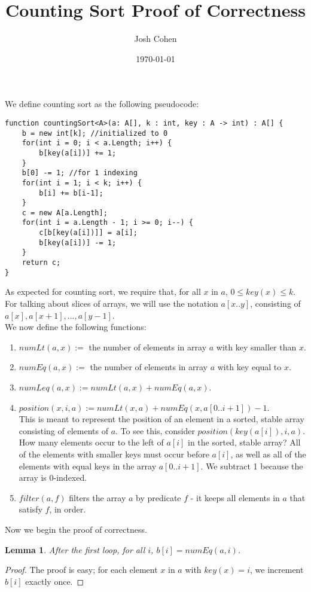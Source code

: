 \documentclass{article}
\title{Counting Sort Proof of Correctness}
\author{Josh Cohen}
\date{\today}
\newtheorem{lemma}[theorem]{Lemma}
\begin{document}
\maketitle
We define counting sort as the following pseudocode:
\begin{verbatim}
function countingSort<A>(a: A[], k : int, key : A -> int) : A[] {
    b = new int[k]; //initialized to 0
    for(int i = 0; i < a.Length; i++) {
        b[key(a[i])] += 1;	
    }
    b[0] -= 1; //for 1 indexing
    for(int i = 1; i < k; i++) {
        b[i] += b[i-1];
    }
    c = new A[a.Length];
    for(int i = a.Length - 1; i >= 0; i--) {
        c[b[key(a[i])]] = a[i];
        b[key(a[i])] -= 1;
    }
    return c;
}
\end{verbatim}
As expected for counting sort, we require that, for all $x$ in $a$, $0 \leq key(x) \leq k$.
\\For talking about slices of arrays, we will use the notation $a[x..y]$, consisting of $a[x], a[x+1],...,a[y-1]$.
\\We now define the following functions:
\begin{enumerate}
\item
$numLt(a, x) :=$ the number of elements in array $a$ with key smaller than $x$.
\item
$numEq(a, x):=$ the number of elements in array $a$ with key equal to $x$.
\item
$numLeq(a,x) := numLt(a, x) + numEq(a,x)$.
\item
$position(x, i, a) := numLt(x, a) + numEq(x, a[0..i+1]) - 1$. 
\\This is meant to represent the position of an element in a sorted, stable array consisting of elements of $a$. To see this, consider $position(key(a[i]), i, a)$. How many elements occur to the left of $a[i]$ in the sorted, stable array? All of the elements with smaller keys must occur before $a[i]$, as well as all of the elements with equal keys in the array $a[0..i+1]$. We subtract 1 because the array is 0-indexed.
\item
$filter(a, f)$ filters the array $a$ by predicate $f$ - it keeps all elements in $a$ that satisfy $f$, in order.
\end{enumerate}
Now we begin the proof of correctness.
\begin{lemma}
After the first loop, for all $i$, $b[i] = numEq(a, i)$.
\end{lemma}
\begin{proof}
The proof is easy; for each element $x$ in $a$ with $key(x) = i$, we increment $b[i]$ exactly once.
\end{proof}
\end{document}
